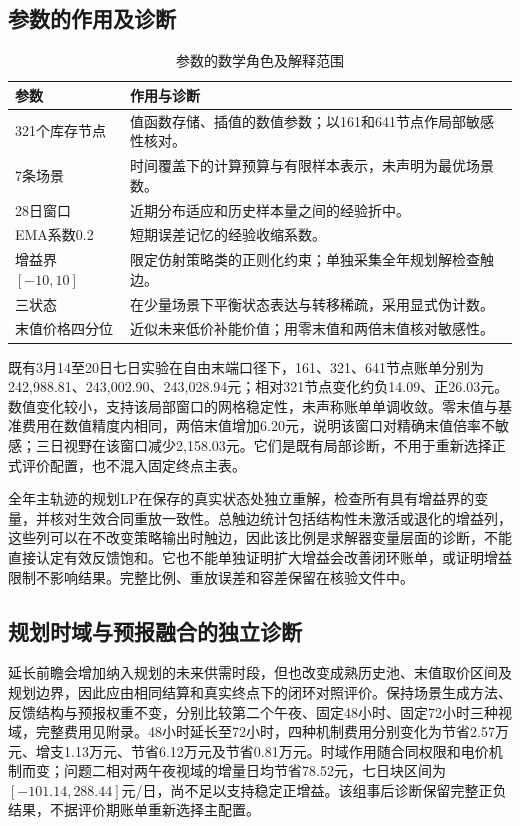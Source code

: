 \documentclass[UTF8,a4paper,zihao=-4,fontset=mac]{ctexart}
\begin{document}
\subsection{参数的作用及诊断}
\begin{table}[htbp]\centering\small
\caption{参数的数学角色及解释范围}
\begin{tabular}{lp{10.2cm}}\toprule
参数 & 作用与诊断 \\ \midrule
321个库存节点 & 值函数存储、插值的数值参数；以161和641节点作局部敏感性核对。 \\
7条场景 & 时间覆盖下的计算预算与有限样本表示，未声明为最优场景数。 \\
28日窗口 & 近期分布适应和历史样本量之间的经验折中。 \\
EMA系数0.2 & 短期误差记忆的经验收缩系数。 \\
增益界$[-10,10]$ & 限定仿射策略类的正则化约束；单独采集全年规划解检查触边。 \\
三状态 & 在少量场景下平衡状态表达与转移稀疏，采用显式伪计数。 \\
末值价格四分位 & 近似未来低价补能价值；用零末值和两倍末值核对敏感性。 \\
\bottomrule\end{tabular}\end{table}
既有3月14至20日七日实验在自由末端口径下，161、321、641节点账单分别为242,988.81、243,002.90、243,028.94元；相对321节点变化约负14.09、正26.03元。数值变化较小，支持该局部窗口的网格稳定性，未声称账单单调收敛。零末值与基准费用在数值精度内相同，两倍末值增加6.20元，说明该窗口对精确末值倍率不敏感；三日视野在该窗口减少2,158.03元。它们是既有局部诊断，不用于重新选择正式评价配置，也不混入固定终点主表。


全年主轨迹的规划LP在保存的真实状态处独立重解，检查所有具有增益界的变量，并核对生效合同重放一致性。总触边统计包括结构性未激活或退化的增益列，这些列可以在不改变策略输出时触边，因此该比例是求解器变量层面的诊断，不能直接认定有效反馈饱和。它也不能单独证明扩大增益会改善闭环账单，或证明增益限制不影响结果。完整比例、重放误差和容差保留在核验文件中。


\subsection{规划时域与预报融合的独立诊断}
延长前瞻会增加纳入规划的未来供需时段，但也改变成熟历史池、末值取价区间及规划边界，因此应由相同结算和真实终点下的闭环对照评价。保持场景生成方法、反馈结构与预报权重不变，分别比较第二个午夜、固定48小时、固定72小时三种视域，完整费用见附录。48小时延长至72小时，四种机制费用分别变化为节省2.57万元、增支1.13万元、节省6.12万元及节省0.81万元。时域作用随合同权限和电价机制而变；问题二相对两午夜视域的增量日均节省78.52元，七日块区间为$[-101.14,288.44]$元/日，尚不足以支持稳定正增益。该组事后诊断保留完整正负结果，不据评价期账单重新选择主配置。
\end{document}
